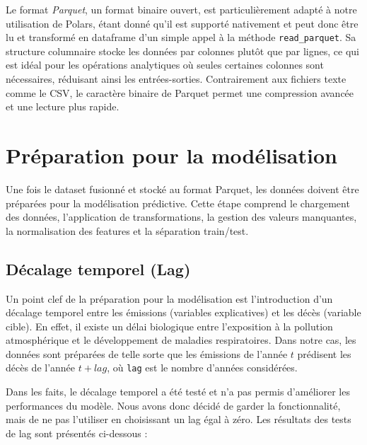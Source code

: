 \documentclass[11pt,a4paper]{article}
\begin{document}
Le format \emph{Parquet}, un format binaire ouvert, est particulièrement adapté à notre utilisation de Polars, étant donné qu'il est supporté nativement et peut donc être lu et transformé en dataframe d'un simple appel à la méthode \lstinline{read_parquet}. Sa structure columnaire stocke les données par colonnes plutôt que par lignes, ce qui est idéal pour les opérations analytiques où seules certaines colonnes sont nécessaires, réduisant ainsi les entrées-sorties. Contrairement aux fichiers texte comme le CSV, le caractère binaire de Parquet permet une compression avancée et une lecture plus rapide.





\clearpage
\section{Préparation pour la modélisation}

Une fois le dataset fusionné et stocké au format Parquet, les données doivent être préparées pour la modélisation prédictive. Cette étape comprend le chargement des données, l'application de transformations, la gestion des valeurs manquantes, la normalisation des features et la séparation train/test.

\subsection{Décalage temporel (Lag)}

Un point clef de la préparation pour la modélisation est l'introduction d'un décalage temporel entre les émissions (variables explicatives) et les décès (variable cible). En effet, il existe un délai biologique entre l'exposition à la pollution atmosphérique et le développement de maladies respiratoires. Dans notre cas, les données sont préparées de telle sorte que les émissions de l'année $t$ prédisent les décès de l'année $t + lag$, où \lstinline{lag} est le nombre d'années considérées.

Dans les faits, le décalage temporel a été testé et n'a pas permis d'améliorer les performances du modèle. Nous avons donc décidé de garder la fonctionnalité, mais de ne pas l'utiliser en choisissant un lag égal à zéro. Les résultats des tests de lag sont présentés ci-dessous :
\end{document}
